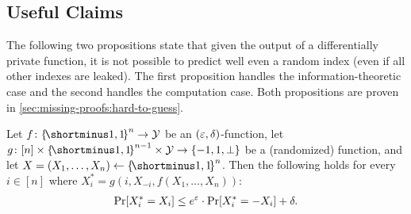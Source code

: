 \subsection{Useful Claims}

The following two propositions state that given the output of a differentially private function, it is not possible to predict well even a random index (even if all other indexes are leaked). The first proposition handles the information-theoretic case and the second handles the computation case. Both propositions are proven in \cref{sec:missing-proofs:hard-to-guess}. 

\def\propHardToGuessInf{
    Let $f\colon \oo^n \rightarrow \cY$ be an $(\eps,\delta)$-\DP function, let $g \colon [n] \times \oo^{n-1} \times \cY \rightarrow \set{-1,1,\bot}$ be a (randomized) function, and let $X = (X_1,\ldots,X_n) \la \oo^n$. Then the following holds for every $i \in [n]$ where $X_i^* = g(i,X_{-i},f(X_1,\ldots,X_n))$:
    \begin{align*}
        \pr{X_i^* = X_i} \leq e^{\eps}\cdot \pr{X_i^* = -X_i} + \delta.
    \end{align*}
}

\begin{proposition}\label{prop:hard-to-guess-inf}
    \propHardToGuessInf
\end{proposition}


\def\propHardToGuessComp{
    Let $f = \set{f_{\pk} \colon \oo^{n(\pk)} \rightarrow \zo^{m(\pk)}}_{\pk \in \bbN}$ be an $(\eps,\delta)$-\CDP function ensemble, and let $\set{g_{\pk}}_{\pk \in \bbN}$ be a poly-size circuit family. Then, for large enough $\pk$ and $X = (X_1,\ldots,X_{n(\pk)}) \la \oo^{n(\pk)}$, the following holds for every $i \in [n(\pk)]$ where $X_i^* = g_{\pk}(i,X_{-i},f_{\pk}(X_1,\ldots,X_n))$:
    \begin{align*}
        \pr{X_i^* = X_i} \leq e^{\eps(\pk)}\cdot \pr{X_i^* = -X_i} + \delta(\pk).
    \end{align*}
}


